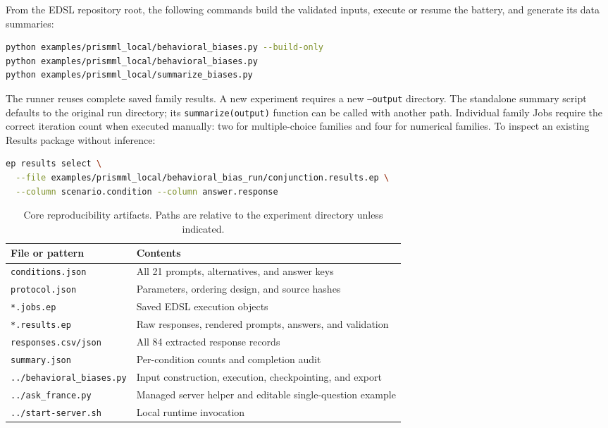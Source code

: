 \documentclass[11pt,letterpaper]{article}
\begin{document}
From the EDSL repository root, the following commands build the validated
inputs, execute or resume the battery, and generate its data summaries:
\begin{lstlisting}[language=bash]
python examples/prismml_local/behavioral_biases.py --build-only
python examples/prismml_local/behavioral_biases.py
python examples/prismml_local/summarize_biases.py
\end{lstlisting}
The runner reuses complete saved family results. A new experiment requires a
new \texttt{--output} directory. The standalone summary script defaults to the
original run directory; its \texttt{summarize(output)} function can be called
with another path. Individual family Jobs require the correct iteration count
when executed manually: two for multiple-choice families and four for numerical
families. To inspect an existing Results package without inference:
\begin{lstlisting}[language=bash]
ep results select \
  --file examples/prismml_local/behavioral_bias_run/conjunction.results.ep \
  --column scenario.condition --column answer.response
\end{lstlisting}

\begin{table}[htbp]
\centering\small
\caption{Core reproducibility artifacts. Paths are relative to the experiment directory unless indicated.}
\begin{tabularx}{\linewidth}{@{}lY@{}}
\toprule
File or pattern & Contents \\
\midrule
\texttt{conditions.json} & All 21 prompts, alternatives, and answer keys \\
\texttt{protocol.json} & Parameters, ordering design, and source hashes \\
\texttt{*.jobs.ep} & Saved EDSL execution objects \\
\texttt{*.results.ep} & Raw responses, rendered prompts, answers, and validation \\
\texttt{responses.csv/json} & All 84 extracted response records \\
\texttt{summary.json} & Per-condition counts and completion audit \\
\texttt{../behavioral\_biases.py} & Input construction, execution, checkpointing, and export \\
\texttt{../ask\_france.py} & Managed server helper and editable single-question example \\
\texttt{../start-server.sh} & Local runtime invocation \\
\bottomrule
\end{tabularx}
\end{table}
\end{document}
